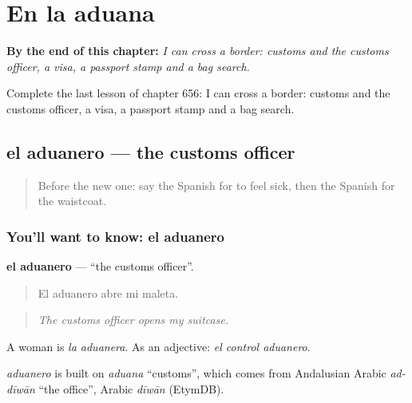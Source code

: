 
\chapter{En la aduana}
\label{ch:es-en-la-aduana}

\begin{chapteropening}
\textbf{By the end of this chapter:} \emph{I can cross a border: customs and the customs officer, a visa, a passport stamp and a bag search.}

Complete the last lesson of chapter 656: I can cross a border: customs and the customs officer, a visa, a passport stamp and a bag search.
\end{chapteropening}

\section[el aduanero]{el aduanero — the customs officer}

\label{lesson:ES-C656-aduanero}



\begin{quote}
Before the new one: say the Spanish for to feel sick, then the Spanish for the waistcoat.
\end{quote}

\subsection*{You'll want to know: el aduanero}
\textbf{el aduanero} — \textquotedblleft{}the customs officer\textquotedblright{}.

\begin{quote}
El aduanero abre mi maleta.
\end{quote}

\begin{quote}
\emph{The customs officer opens my suitcase.}
\end{quote}

A woman is \emph{la aduanera}. As an adjective: \emph{el control aduanero}.

\begin{cousinweb}
\emph{aduanero} is built on \emph{aduana} \textquotedblleft{}customs\textquotedblright{}, which comes from Andalusian Arabic \emph{ad-dīwān} \textquotedblleft{}the office\textquotedblright{}, Arabic \emph{dīwān} (EtymDB).
\end{cousinweb}

